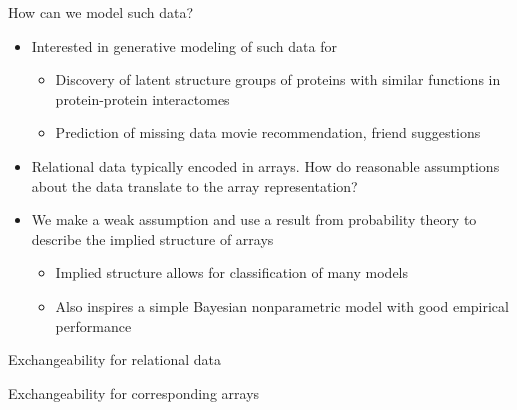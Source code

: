 \begin{frame}{How can we model such data?}
  \begin{block}{}
    \begin{itemize}
      \item Interested in generative modeling of such data for \eg
      \begin{itemize}
        \item Discovery of latent structure \eg groups of proteins with similar functions in protein-protein interactomes
        \item Prediction of missing data \eg movie recommendation, friend suggestions
      \end{itemize}
      \vspace{\baselineskip}
      \item Relational data typically encoded in arrays. How do reasonable assumptions about the data translate to the array representation?
      \vspace{\baselineskip}
      \item We make a weak assumption and use a result from probability theory to describe the implied structure of arrays
      \begin{itemize}
        \item Implied structure allows for classification of many models
        \item Also inspires a simple Bayesian nonparametric model with good empirical performance
      \end{itemize}
    \end{itemize}
  \end{block}
\end{frame}

\begin{frame}{Exchangeability for relational data}
  \begin{block}{}
  \center
  
  \end{block}
\end{frame}

\begin{frame}{Exchangeability for corresponding arrays}
  \begin{block}{}
  \center
  
  \end{block}
\end{frame}

